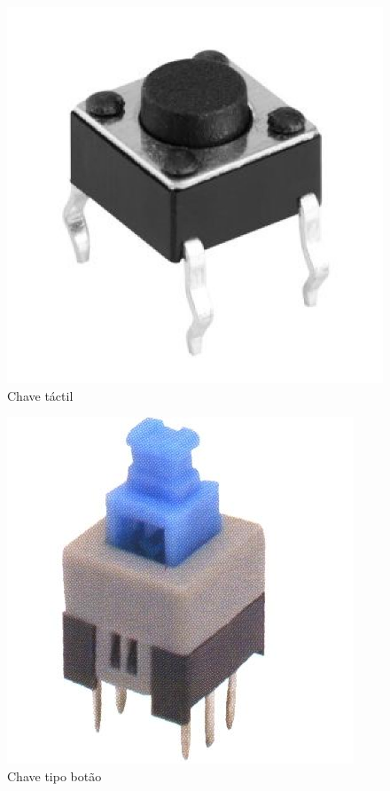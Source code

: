 \begin{figure}[h]
\centering
\includegraphics[scale=0.15]{chapter1/tactil.jpg}
\caption{Chave táctil}
\label{fig:6}
\end{figure}
\begin{figure}[h]
\centering
\includegraphics[scale=0.3]{chapter1/botao.jpg}
\caption{Chave tipo botão}
\label{fig:7}
\end{figure}
